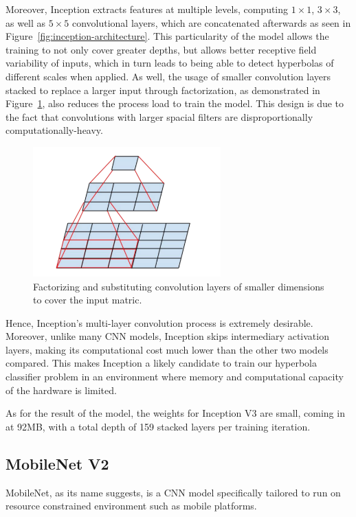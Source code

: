 \documentclass[se,blockletter]{uw-wkrpt}
\begin{document}
Moreover, Inception extracts features at multiple levels, computing $1\times 1$, $3\times 3$, as well as $5 \times 5$ convolutional layers, which are concatenated afterwards as seen in Figure~\ref{fig:inception-architecture}. This particularity of the model allows the training to not only cover greater depths, but allows better receptive field variability of inputs, which in turn leads to being able to detect hyperbolas of different scales when applied. As well, the usage of smaller convolution layers stacked to replace a larger input through factorization, as demonstrated in Figure~\ref{fig:convolution-substitution}, also reduces the process load to train the model. This design is due to the fact that convolutions with larger spacial filters are disproportionally computationally-heavy. 

\begin{figure}
  \centering
  \includegraphics[height=5cm]{convolution-substitution}
  \caption{Factorizing and substituting convolution layers of smaller dimensions to cover the input matric.~\cite{ref:}}
  \label{fig:convolution-substitution}
\end{figure}

Hence, Inception's multi-layer convolution process is extremely desirable. Moreover, unlike many CNN models, Inception skips intermediary activation layers, making its computational cost much lower than the other two models compared. This makes Inception a likely candidate to train our hyperbola classifier problem in an environment where memory and computational capacity of the hardware is limited. 

As for the result of the model, the weights for Inception V3 are small, coming in at 92MB, with a total depth of 159 stacked layers per training iteration. 

\subsection{MobileNet V2}
MobileNet, as its name suggests, is a CNN model specifically tailored to run on resource constrained environment such as mobile platforms. 
\end{document}
